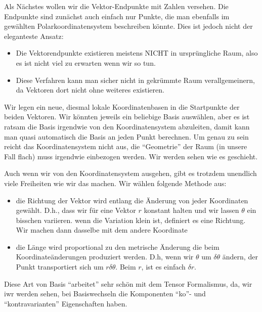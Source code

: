 \documentclass[11pt,a4paper]{article}
\begin{document}
Als Nächstes wollen wir die Vektor-Endpunkte mit Zahlen versehen. Die Endpunkte sind zunächst auch einfach nur Punkte, die man ebenfalls im gewählten Polarkoordinatensystem beschreiben könnte. Dies ist jedoch nicht der eleganteste Ansatz:
\begin{itemize}
\item Die Vektorendpunkte existieren meistens NICHT in ursprüngliche Raum, also es ist nicht viel zu erwarten wenn wir so tun.
\item Diese Verfahren kann man sicher nicht in gekrümmte Raum verallgemeinern, da Vektoren dort nicht ohne weiteres existieren.
\end{itemize}

Wir legen ein neue, diesmal lokale Koordinatenbasen in die Startpunkte der beiden Vektoren. Wir könnten jeweils ein beliebige Basis auswählen, aber es ist ratsam die Basis irgendwie von den Koordinatensystem abzuleiten, damit kann man quasi automatisch die Basis an jeden Punkt berechnen. Um genau zu sein reicht das Koordinatensystem nicht aus, die "`Geometrie"' der Raum (in unsere Fall flach) muss irgendwie einbezogen werden. Wir werden sehen wie es geschieht. 

Auch wenn wir von den Koordinatensystem ausgehen, gibt es trotzdem unendlich viele Freiheiten wie wir das machen. Wir wählen folgende Methode aus:
\begin{itemize}
\item die Richtung der Vektor wird entlang die Änderung von jeder Koordinaten gewählt. D.h., dass wir für eine Vektor $r$ konstant halten und wir lassen $\theta$ ein bisschen variieren. wenn die Variation klein ist, definiert es eine Richtung. Wir machen dann dasselbe mit dem andere Koordinate
\item die Länge wird proportional zu den metrische Änderung die beim Koordinateänderungen produziert werden. D.h, wenn wir $\theta$ um $\delta\theta$ ändern, der Punkt transportiert sich um $r\delta\theta$. Beim $r$, ist es einfach $\delta r$.
\end{itemize}
Diese Art von Basis "`arbeitet"' sehr schön mit dem Tensor Formalismus, da, wir iwr werden sehen, bei Basiswechseln die Komponenten "`ko"'- und "`kontravarianten"' Eigenschaften haben.
\end{document}
